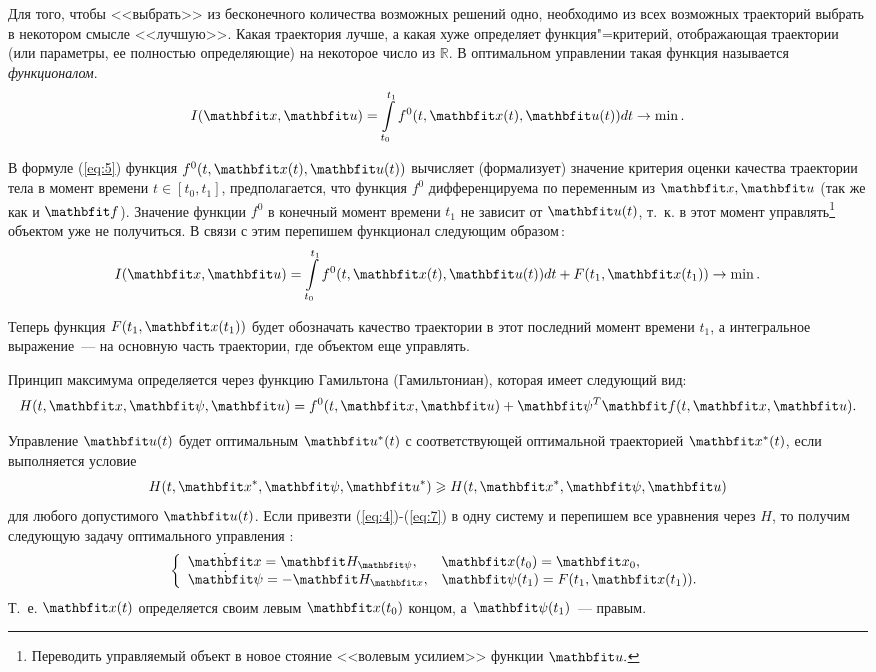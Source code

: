 \documentclass[a4paper,14pt, openany, twoside, draft]{extbook} %
\begin{document}
Для того, чтобы <<выбрать>> из бесконечного количества возможных решений одно, необходимо из всех возможных траекторий выбрать в некотором смысле <<лучшую>>.  Какая траектория лучше, а какая хуже определяет функция"=критерий, отображающая траектории (или параметры, ее полностью определяющие) на некоторое число из $\mathbb{R}$.  В оптимальном управлении такая функция называется \emph{функционалом}.
\begin{equation}
  \label{eq:5}
  I(\vecx,\vecu)=\int\limits_{t_0}^{t_1}f^0(t,\vecx(t),\vecu(t))dt \to \min.
\end{equation}

В формуле (\ref{eq:5}) функция $f^0(t,\vecx(t),\vecu(t))$ вычисляет (формализует) значение критерия оценки качества траектории тела в момент времени $t\in[t_0,t_1]$, предполагается, что функция $f^0$ дифференцируема по переменным из $\vecx,\vecu$ (так же как и $\vecf$).  Значение функции $f^0$ в конечный момент времени $t_1$ не зависит от $\vecu(t)$, т.~к. в этот момент управлять\footnote{Переводить управляемый объект в новое стояние <<волевым усилием>> функции $\vecu.$} объектом уже не получиться.  В связи с этим перепишем функционал следующим образом\,:
\begin{equation}
  \label{eq:6}
  I(\vecx,\vecu)=\int\limits_{t_0}^{t_1}f^0(t,\vecx(t),\vecu(t))dt+F(t_1,\vecx(t_1)) \to \min.
\end{equation}

\noindent{}Теперь функция $F(t_1,\vecx(t_1))$ будет обозначать качество траектории в этот последний момент времени $t_1$, а интегральное выражение~--- на основную часть траектории, где объектом еще  управлять.

Принцип максимума определяется через функцию Гамильтона (Гамильтониан), которая имеет следующий вид:
\begin{equation}
  \label{eq:7}
  H(t,\vecx,\vecpsi,\vecu)=f^0(t,\vecx,\vecu)+\vecpsi^T\vecf(t,\vecx,\vecu).
\end{equation}

Управление $\vecu(t)$ будет оптимальным $\vecu^*(t)$ с соответствующей оптимальной траекторией $\vecx^*(t)$, если выполняется условие
\begin{equation}
  \label{eq:7}
  H(t,\vecx^*,\vecpsi,\vecu^*)\geqslant H(t,\vecx^*,\vecpsi,\vecu)
\end{equation}
для любого допустимого $\vecu(t)$.  Если привезти (\ref{eq:4})-(\ref{eq:7}) в одну систему и перепишем все уравнения через $H$, то получим следующую задачу оптимального управления \cite{sethi}:
\begin{equation}
  \label{eq:8}
  \left\{
    \begin{array}{ll}
      \dot{\vecx}=\vecH_{\vecpsi}, & \vecx(t_0)=\vecx_0,\\
      \dot{\vecpsi}=-\vecH_{\vecx}, & \vecpsi(t_1)=F(t_1,\vecx(t_1)).
    \end{array}
  \right.
\end{equation}
Т.~е. $\vecx(t)$ определяется своим левым $\vecx(t_0)$ концом, а $\vecpsi(t_1)$~--- правым.
\end{document}
